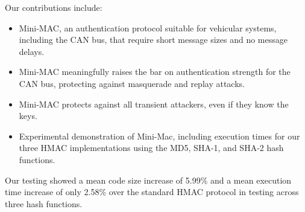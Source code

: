 Our contributions include:
\begin{itemize}

\item Mini-MAC, an authentication protocol suitable for vehicular systems, including the CAN bus, 
that require short message sizes and no message delays.

\item Mini-MAC meaningfully raises the bar on authentication strength for the CAN bus, protecting against
masquerade and replay attacks.

\item Mini-MAC protects against all transient attackers, even if they know the keys.

\item Experimental demonstration of Mini-Mac, including execution times for our three HMAC
implementations using the MD5, SHA-1, and SHA-2 hash functions.

\end{itemize}

Our testing showed a mean code size increase of 5.99\% and a mean execution time increase of only 2.58\% over the standard HMAC protocol in testing across three hash functions.